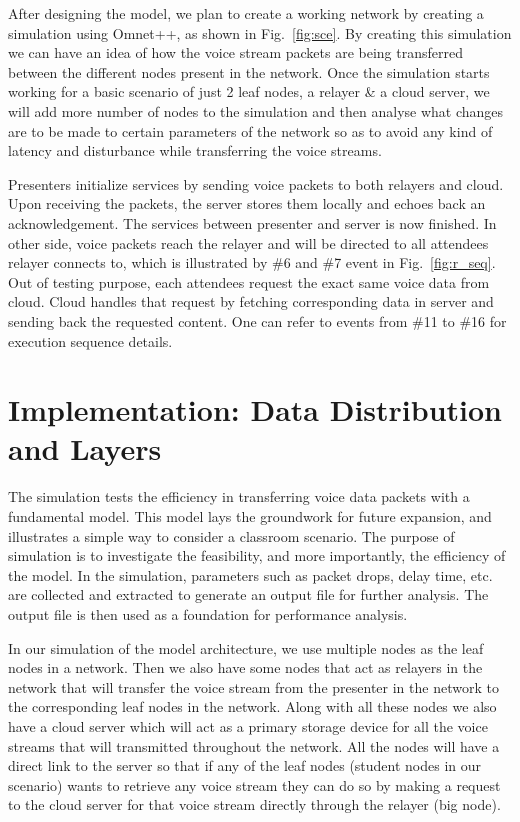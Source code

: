 After designing the model, we plan to create a working 
network by creating a simulation using Omnet++, as shown in Fig.~\ref{fig:sce}. 
By creating 
this simulation we can have an idea of how the voice stream packets are being 
transferred between the different nodes present in the network. Once the 
simulation starts working for a basic scenario of just 2 leaf nodes, a relayer 
\& a cloud server, we will add more number of nodes to the simulation and then 
analyse what changes are to be made to certain parameters of the network so as 
to avoid any kind of latency and disturbance while transferring the voice 
streams. 

Presenters initialize services by sending voice packets to both relayers and 
cloud. Upon receiving the packets, the server stores them 
locally and echoes back an acknowledgement. The services between presenter and 
server is now finished. In other side,
voice packets reach the relayer and will be directed to all attendees relayer 
connects to, which is illustrated by \#6 and \#7 event in Fig.~\ref{fig:r_seq}. 
Out of 
testing purpose, each attendees request the exact same voice data from cloud. 
Cloud handles that request by fetching corresponding data in server and sending 
back the requested content. One can refer to events from \#11 to \#16 for 
execution sequence details. 
 

 
\section{Implementation: Data Distribution and Layers}

The simulation tests the efficiency in transferring voice data packets 
with a fundamental model. This model lays the groundwork for future expansion, 
and illustrates a simple way to consider a classroom scenario. The purpose of 
simulation is 
to investigate the feasibility, and more importantly, the efficiency of the 
model. In the simulation, parameters such as packet drops, delay time, etc. are 
collected and extracted to generate an output file for further analysis. The 
output file is then used as 
a foundation for performance analysis.  


In our simulation of the model architecture, we use multiple nodes 
as the leaf nodes in a network. 
Then we also have some nodes that act as relayers in the network that will 
transfer the voice stream from the presenter in the network to 
the corresponding leaf nodes in the network. Along with all these nodes we also 
have a cloud server which will act as a primary storage device for all the 
voice streams that will transmitted throughout the network. All the nodes will 
have a direct link to the server so that if any of the leaf nodes (student 
nodes in our scenario) wants to retrieve any voice stream they can do so by 
making a request to 
the cloud server for that voice stream directly through the relayer (big node). 

